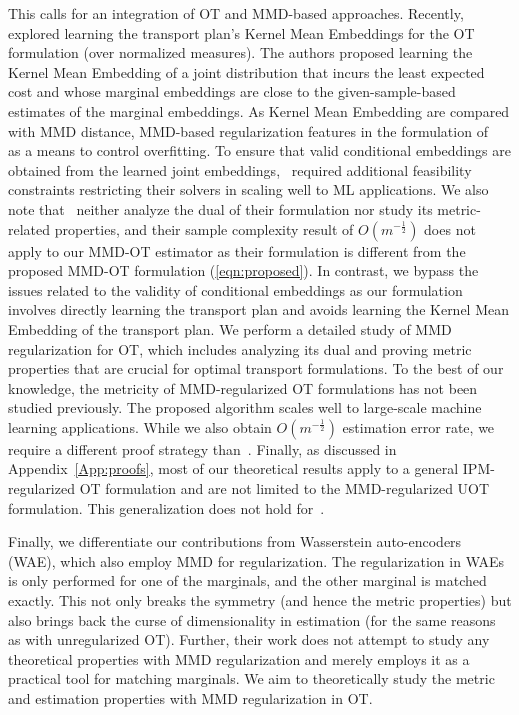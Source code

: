 This calls for an integration of OT and MMD-based approaches.
Recently,~\cite{ot-kme} explored learning the transport plan’s Kernel Mean Embeddings for the OT formulation (over normalized measures). 
The authors proposed learning the Kernel Mean Embedding of a joint distribution that incurs the least expected cost and whose marginal embeddings are close to the given-sample-based estimates of the marginal embeddings. 
As Kernel Mean Embedding are compared with MMD distance, MMD-based regularization features in the formulation of~\cite{ot-kme} as a means to control overfitting. To ensure that valid conditional embeddings are obtained from the learned joint embeddings,~\cite{ot-kme} required additional feasibility constraints restricting their solvers in scaling well to ML applications.
We also note that~\cite{ot-kme} neither analyze the dual of their formulation nor study its metric-related properties, and their sample complexity result of $O(m^{-\frac{1}{2}})$ does not apply to our MMD-OT estimator as their formulation is different from the proposed MMD-OT formulation (\ref{eqn:proposed}).
In contrast, we bypass the issues related to the validity of conditional embeddings as our formulation involves directly learning the transport plan and avoids learning the Kernel Mean Embedding of the transport plan. 
We perform a detailed study of MMD regularization for OT, which includes analyzing its dual and proving metric properties that are crucial for optimal transport formulations. 
To the best of our knowledge, the metricity of MMD-regularized OT formulations has not been studied previously. The proposed algorithm scales well to large-scale machine learning applications. 
While we also obtain $O(m^{-\frac{1}{2}})$ estimation error rate, we require a different proof strategy than~\cite{ot-kme}. Finally, as discussed in Appendix~\ref{App:proofs}, most of our theoretical results apply to a general IPM-regularized OT formulation and are not limited to the MMD-regularized UOT formulation. This generalization does not hold for~\cite{ot-kme}.

Finally, we differentiate our contributions from Wasserstein auto-encoders (WAE), which also employ MMD for regularization. The regularization in WAEs is only performed for one of the marginals, and the other marginal is matched exactly. This not only breaks the symmetry (and hence the metric properties) but also brings back the curse of dimensionality in estimation (for the same reasons as with unregularized OT). Further, their work does not attempt to study any theoretical properties with MMD regularization and merely employs it as a practical tool for matching marginals. We aim to theoretically study the metric and estimation properties with MMD regularization in OT.

